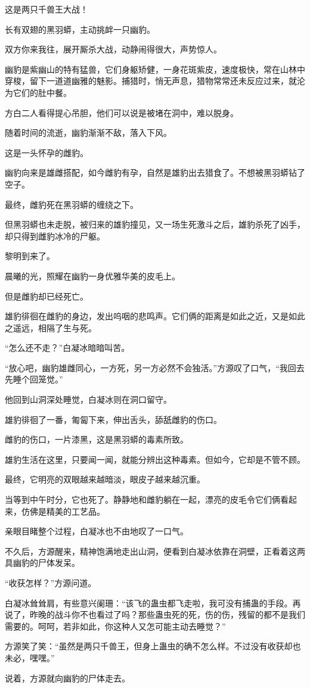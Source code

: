 \begin{this_body}
这是两只千兽王大战！

长有双翅的黑羽蟒，主动挑衅一只幽豹。

双方你来我往，展开厮杀大战，动静闹得很大，声势惊人。

幽豹是紫幽山的特有猛兽，它们身躯矫健，一身花斑紫皮，速度极快，常在山林中穿梭，留下一道道幽雅的魅影。捕猎时，悄无声息，猎物常常还未反应过来，就沦为它们的肚中餐。

方白二人看得提心吊胆，他们可以说是被堵在洞中，难以脱身。

随着时间的流逝，幽豹渐渐不敌，落入下风。

这是一头怀孕的雌豹。

幽豹向来是雄雌搭配，如今雌豹有孕，自然是雄豹出去猎食了。不想被黑羽蟒钻了空子。

最终，雌豹死在黑羽蟒的缠绕之下。

但黑羽蟒也未走脱，被归来的雄豹撞见，又一场生死激斗之后，雄豹杀死了凶手，却只得到雌豹冰冷的尸躯。

黎明到来了。

晨曦的光，照耀在幽豹一身优雅华美的皮毛上。

但是雌豹却已经死亡。

雄豹徘徊在雌豹的身边，发出呜咽的悲鸣声。它们俩的距离是如此之近，又是如此之遥远，相隔了生与死。

“怎么还不走？”白凝冰暗暗叫苦。

“放心吧，幽豹雄雌同心，一方死，另一方必然不会独活。”方源叹了口气，“我回去先睡个回笼觉。”

他回到山洞深处睡觉，白凝冰则在洞口留守。

雄豹徘徊了一番，匍匐下来，伸出舌头，舔舐雌豹的伤口。

雌豹的伤口，一片漆黑，这是黑羽蟒的毒素所致。

雄豹生活在这里，只要闻一闻，就能分辨出这种毒素。但如今，它却是不管不顾。

最终，它明亮的双眼越来越暗淡，眼皮子越来越沉重。

当等到中午时分，它也死了。静静地和雌豹躺在一起，漂亮的皮毛令它们俩看起来，仿佛是精美的工艺品。

亲眼目睹整个过程，白凝冰也不由地叹了一口气。

不久后，方源醒来，精神饱满地走出山洞，便看到白凝冰依靠在洞壁，正看着这两具幽豹的尸体发呆。

“收获怎样？”方源问道。

白凝冰耸耸肩，有些意兴阑珊：“该飞的蛊虫都飞走啦，我可没有捕蛊的手段。再说了，昨晚的战斗你不也看过了吗？那些蛊虫死的死，伤的伤，残留的都不是我们需要的。呵呵，若非如此，你这种人又怎可能主动去睡觉？”

方源笑了笑：“虽然是两只千兽王，但身上蛊虫的确不怎么样。不过没有收获却也未必，嘿嘿。”

说着，方源就向幽豹的尸体走去。

\end{this_body}

